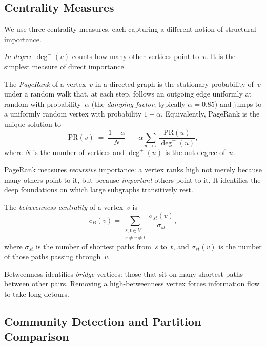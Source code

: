 \subsection{Centrality Measures}
\label{sec:prelim-centrality}

We use three centrality measures, each capturing a different notion of structural importance.

\emph{In-degree} $\deg^{-}(v)$ counts how many other vertices point to~$v$. It is the simplest measure of direct importance.

\begin{definition}
\label{def:pagerank}
The \emph{PageRank} of a vertex~$v$ in a directed graph is the stationary probability of~$v$ under a random walk that, at each step, follows an outgoing edge uniformly at random with probability~$\alpha$ (the \emph{damping factor}, typically $\alpha = 0.85$) and jumps to a uniformly random vertex with probability $1 - \alpha$.  Equivalently, PageRank is the unique solution to
\[
  \mathrm{PR}(v) \;=\; \frac{1-\alpha}{N} \;+\; \alpha \sum_{u \to v} \frac{\mathrm{PR}(u)}{\deg^{+}(u)},
\]
where $N$ is the number of vertices and $\deg^{+}(u)$ is the out-degree of~$u$.
\end{definition}

PageRank measures \emph{recursive} importance: a vertex ranks high not merely because many others point to it, but because \emph{important} others point to it. It identifies the deep foundations on which large subgraphs transitively rest.

\begin{definition}
\label{def:betweenness}
The \emph{betweenness centrality} of a vertex~$v$ is
\[
  c_B(v) = \sum_{\substack{s, t \in V \\ s \ne v \ne t}} \frac{\sigma_{st}(v)}{\sigma_{st}},
\]
where $\sigma_{st}$ is the number of shortest paths from~$s$ to~$t$, and $\sigma_{st}(v)$ is the number of those paths passing through~$v$.
\end{definition}

Betweenness identifies \emph{bridge} vertices: those that sit on many shortest paths between other pairs. Removing a high-betweenness vertex forces information flow to take long detours.

\subsection{Community Detection and Partition Comparison}
\label{sec:prelim-community}


